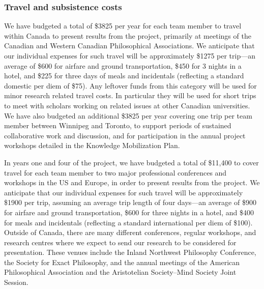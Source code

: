 \documentclass[12pt]{article}
\begin{document}
\subsubsection*{Travel and subsistence costs}

We have budgeted a total of \$3825 per year for each team member to travel
within Canada to present results from the project, primarily at meetings of
the Canadian and Western Canadian Philosophical Associations.  We anticipate
that our individual expenses for such travel will be approximately \$1275 per
trip---an average of \$600 for airfare and ground transportation, \$450 for 3
nights in a hotel, and \$225 for three days of meals and incidentals
(reflecting a standard domestic per diem of \$75). Any leftover funds from
this category will be used for minor research related travel costs. In
particular they will be used for short trips to meet with scholars working on
related issues at other Canadian universities. We have also budgeted an
additional \$3825 per year covering one trip per team member between Winnipeg
and Toronto, to support periods of sustained collaborative work and
discussion, and for participation in the annual project workshops detailed in
the Knowledge Mobilization Plan. 

In years one and four of the project, we have budgeted a total of \$11,400 to
cover travel for each team member to two major professional conferences and
workshops in the US and Europe, in order to present results from the project.
We anticipate that our individual expenses for such travel will be
approximately \$1900 per trip, assuming an average trip length of four
days---an  average of \$900 for airfare and ground transportation, \$600 for
three nights in a hotel, and \$400 for
meals and incidentals (reflecting a standard international per diem of \$100). 
Outside of Canada, there are many different conferences, regular workshops,
and research centres where we expect to send our research to be considered for
presentation.  These venues include the Inland Northwest Philosophy
Conference, the Society for Exact Philosophy, and the annual meetings of the
American Philosophical Association and the Aristotelian Society--Mind Society
Joint Session.
\end{document}
